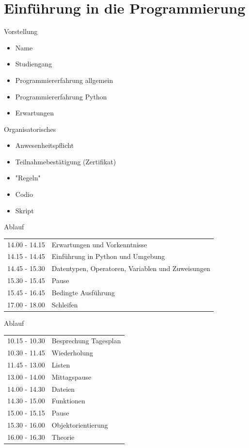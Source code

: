 \section{Einführung in die Programmierung}

\begin{frame}{Vorstellung}
\begin{itemize}
	\item Name
	\item Studiengang 
	\item Programmiererfahrung allgemein
	\item Programmiererfahrung Python
	\item Erwartungen
\end{itemize}
\end{frame}

\begin{frame}{Organisatorisches}
    \begin{itemize}
        \item Anwesenheitspflicht
        \item Teilnahmebestätigung (Zertifikat)
        \item "Regeln"
        \item Codio
        \item Skript
    \end{itemize}
\end{frame}

\begin{frame}{Ablauf}
\begin{tabular}{ l l }
	14.00 - 14.15 & Erwartungen und Vorkenntnisse\\
	14.15 - 14.45 & Einführung in Python und Umgebung \\
	14.45 - 15.30 & Datentypen, Operatoren, Variablen und Zuweisungen\\
	15.30 - 15.45 & Pause \\
	15.45 - 16.45 & Bedingte Ausführung \\
	17.00 - 18.00 & Schleifen \\
	
\end{tabular}
\end{frame}

\begin{frame}{Ablauf}

\begin{tabular}{ l l }
	10.15 - 10.30 & Besprechung Tagesplan\\
	10.30 - 11.45 & Wiederholung \\
	11.45 - 13.00 & Listen \\
	13.00 - 14.00 & Mittagspause\\
	14.00 - 14.30 & Dateien\\
	14.30 - 15.00 & Funktionen\\
	15.00 - 15.15 & Pause\\
	15.30 - 16.00 & Objektorientierung\\
	16.00 - 16.30 & Theorie\\

	
\end{tabular}
\end{frame}

